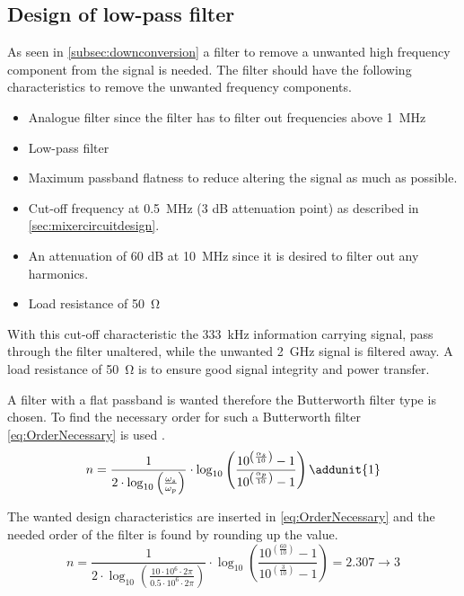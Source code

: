 \subsection{Design of low-pass filter}\label{sec:designLPFilter}
As seen in \autoref{subsec:downconversion} a filter to remove a unwanted high frequency component from the signal is needed. The filter should have the following characteristics to remove the unwanted frequency components. 
\begin{itemize}
\item Analogue filter since the filter has to filter out frequencies above \SI{1}{\mega\hertz}
\item Low-pass filter 
\item Maximum passband flatness to reduce altering the signal as much as possible.
\item Cut-off frequency at \SI{0.5}{\mega\hertz} (3 dB attenuation point) as described in \autoref{sec:mixercircuitdesign}.
\item An attenuation of 60 dB at \SI{10}{\mega\hertz} since it is desired to filter out any harmonics.
\item Load resistance of \SI{50}{\ohm}
\end{itemize}
With this cut-off characteristic the \SI{333}{\kilo\hertz} information carrying signal, pass through the filter unaltered, while the unwanted  \SI{2}{\giga\hertz} signal is filtered away. A load resistance of \SI{50}{\ohm} is to ensure good signal integrity and power transfer.

A filter with a flat passband is wanted therefore the Butterworth filter type is chosen. To find the necessary order for such a Butterworth filter \autoref{eq:OrderNecessary} is used \citep{AnagogFilters}. 
\begin{equation} \label{eq:OrderNecessary} 
n = \frac{1}{2\cdot \log_{10}\left( \frac{\omega_{s}}{\omega_{p}} \right)} \cdot \log_{10}\left( \frac{10^{ \left( \frac{\alpha_{s}}{10} \right) }-1}{10^{\left( \frac{\alpha_{p}}{10} \right)}-1}  \right) \addunit{1}
\end{equation}
\startexplain
{}
\stopexplain

The wanted design characteristics are inserted in \autoref{eq:OrderNecessary} and the needed order of the filter is found by rounding up the value. 
\begin{equation} \label{eq:FindOrderNecessary} 
n = \frac{1}{2\cdot \log_{10}\left( \frac{10 \cdot 10^{6} \cdot 2\pi}{0.5 \cdot 10^{6} \cdot 2\pi} \right)} \cdot \log_{10}\left( \frac{10^{ \left( \frac{60}{10} \right) }-1}{10^{\left( \frac{3}{10} \right)}-1}  \right) = 2.307 \to 3
\end{equation}

